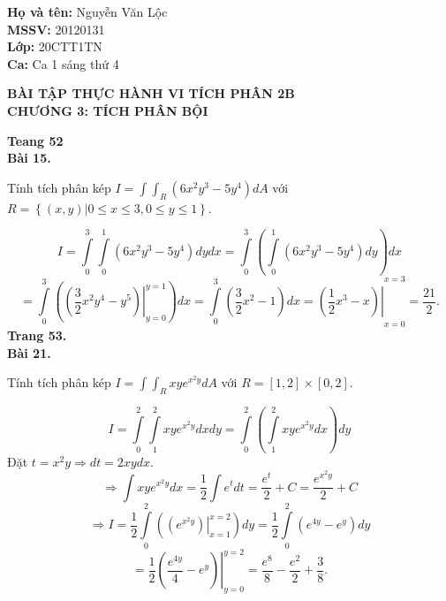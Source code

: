 \documentclass[12pt,a4paper]{article}
\author{Nguyễn Văn Lộc}
\begin{document}
\fancyhf{}
\lhead{}
\chead{}
\rhead{}
\cfoot{\thepage}
\rfoot{}
\lfoot{}
\pagestyle{fancy}
\renewcommand{\headrulewidth}{0pt}
\renewcommand{\footrulewidth}{0pt}
\begin{flushleft}
\begin{mybox}
\textbf{Họ và tên:} Nguyễn Văn Lộc\\
\textbf{MSSV:} 20120131\\ 
\textbf{Lớp:} 20CTT1TN\\
\textbf{Ca:} Ca 1 sáng thứ 4
\end{mybox}
\end{flushleft}
\begin{center}
\textbf{BÀI TẬP THỰC HÀNH VI TÍCH PHÂN 2B}\\
\textbf{CHƯƠNG 3: TÍCH PHÂN BỘI}
\end{center}
\textbf{Teang 52}\\
\textbf{Bài 15.}
\begin{mybox}
Tính tích phân kép  \(I = \int {\int_R {\left( {6{x^2}{y^3} - 5{y^4}} \right)dA} } \) với \(R = \left\{ {\left. {\left( {x,y} \right)} \right|0 \leqslant x \leqslant 3,0 \leqslant y \leqslant 1} \right\}.\)
\end{mybox}
\[I = \int\limits_0^3 {\int\limits_0^1 {\left( {6{x^2}{y^3} - 5{y^4}} \right)dydx = \int\limits_0^3 {\left( {\int\limits_0^1 {\left( {6{x^2}{y^3} - 5{y^4}} \right)dy} } \right)} } } dx\]
\[ = \int\limits_0^3 {\left( {\left. {\left( {\frac{3}{2}{x^2}{y^4} - {y^5}} \right)} \right|_{y = 0}^{y = 1}} \right)dx = \int\limits_0^3 {\left( {\frac{3}{2}{x^2} - 1} \right)dx = \left. {\left( {\frac{1}{2}{x^3} - x} \right)} \right|} } _{x = 0}^{x = 3} = \frac{{21}}{2}.\]
\textbf{Trang 53.}\\
\textbf{Bài 21.}
\begin{mybox}
Tính tích phân kép \(I = \int {\int_R {xy{e^{{x^2}y}}dA} } \) với \(R = \left[ {1,2} \right] \times \left[ {0,2} \right].\)
\end{mybox}
\[I = \int\limits_0^2 {\int\limits_1^2 {xy{e^{{x^2}y}}dx} } dy = \int\limits_0^2 {\left( {\int\limits_1^2 {xy{e^{{x^2}y}}dx} } \right)} dy\]
Đặt \(t = {x^2}y \Rightarrow dt = 2xydx.\)
\[ \Rightarrow \int {xy{e^{{x^2}y}}} dx = \frac{1}{2}\int {{e^t}dt = \frac{{{e^t}}}{2} + C = \frac{{{e^{{x^2}y}}}}{2}}  + C\]
\[ \Rightarrow I = \frac{1}{2}\int\limits_0^2 {\left( {\left. {\left( {{e^{{x^2}y}}} \right)} \right|_{x = 1}^{x = 2}} \right)dy = \frac{1}{2}} \int\limits_0^2 {\left( {{e^{4y}} - {e^y}} \right)} dy\]
\[ = \frac{1}{2}\left. {\left( {\frac{{{e^{4y}}}}{4} - {e^y}} \right)} \right|_{y = 0}^{y = 2} = \frac{{{e^8}}}{8} - \frac{{{e^2}}}{2} + \frac{3}{8}.\]
\end{document}
